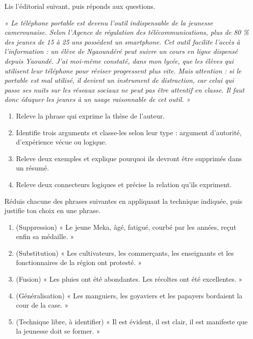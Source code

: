 \documentclass[11pt]{article}
\begin{document}
\begin{exercice}
Lis l'éditorial suivant, puis réponds aux questions.

\emph{« Le téléphone portable est devenu l'outil indispensable de la jeunesse camerounaise. Selon l'Agence de régulation des télécommunications, plus de 80 \% des jeunes de 15 à 25 ans possèdent un smartphone. Cet outil facilite l'accès à l'information : un élève de Ngaoundéré peut suivre un cours en ligne dispensé depuis Yaoundé. J'ai moi-même constaté, dans mon lycée, que les élèves qui utilisent leur téléphone pour réviser progressent plus vite. Mais attention : si le portable est mal utilisé, il devient un instrument de distraction, car celui qui passe ses nuits sur les réseaux sociaux ne peut pas être attentif en classe. Il faut donc éduquer les jeunes à un usage raisonnable de cet outil. »}

\begin{enumerate}
\item Releve la phrase qui exprime la thèse de l'auteur.
\item Identifie trois arguments et classe-les selon leur type : argument d'autorité, d'expérience vécue ou logique.
\item Releve deux exemples et explique pourquoi ils devront être supprimés dans un résumé.
\item Releve deux connecteurs logiques et précise la relation qu'ils expriment.
\end{enumerate}
\end{exercice}

\begin{exercice}
Réduis chacune des phrases suivantes en appliquant la technique indiquée, puis justifie ton choix en une phrase.
\begin{enumerate}
\item (Suppression) « Le jeune Meka, âgé, fatigué, courbé par les années, reçut enfin sa médaille. »
\item (Substitution) « Les cultivateurs, les commerçants, les enseignants et les fonctionnaires de la région ont protesté. »
\item (Fusion) « Les pluies ont été abondantes. Les récoltes ont été excellentes. »
\item (Généralisation) « Les manguiers, les goyaviers et les papayers bordaient la cour de la case. »
\item (Technique libre, à identifier) « Il est évident, il est clair, il est manifeste que la jeunesse doit se former. »
\end{enumerate}
\end{exercice}
\end{document}

